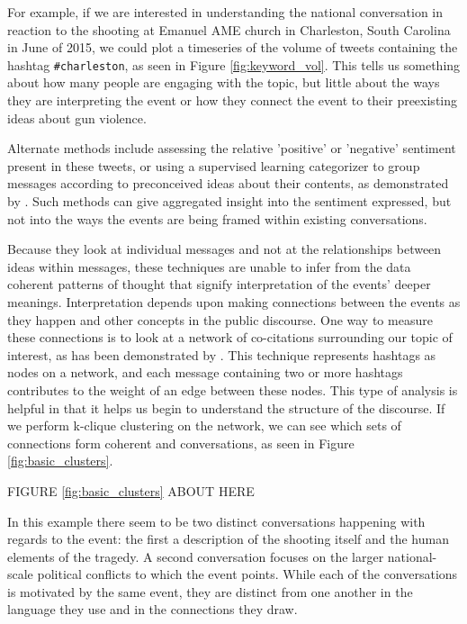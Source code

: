 \documentclass[12pt]{article}
\begin{document}
For example, if we are interested in understanding the national conversation in reaction to the shooting at Emanuel AME church in Charleston, South Carolina in June of 2015, we could plot a timeseries of the volume of tweets containing the hashtag \texttt{\#charleston}, as seen in Figure \ref{fig:keyword_vol}. This tells us something about how many people are engaging with the topic, but little about the ways they are interpreting the event or how they connect the event to their preexisting ideas about gun violence.

Alternate methods include assessing the relative 'positive' or 'negative' sentiment present in these tweets, or using a supervised learning categorizer to group messages according to preconceived ideas about their contents, as demonstrated by \cite{Becker2011,Ritter2010,Zubiaga2011}. Such methods can give aggregated insight into the sentiment expressed, but not into the ways the events are being framed within existing conversations.

Because they look at individual messages and not at the relationships between ideas within messages, these techniques are unable to infer from the data coherent patterns of thought that signify interpretation of the events' deeper meanings. 
Interpretation depends upon making connections between the events as they happen and other concepts in the public discourse. 
One way to measure these connections is to look at a network of co-citations surrounding our topic of interest, as has been demonstrated by \cite{Cogan2012,Smith2014}. 
This technique represents hashtags as nodes on a network, and each message containing two or more hashtags contributes to the weight of an edge between these nodes. 
This type of analysis is helpful in that it helps us begin to understand the structure of the discourse. 
If we perform k-clique clustering on the network, we can see which sets of connections form coherent and conversations, as seen in Figure \ref{fig:basic_clusters}.

\begin{center}
FIGURE \ref{fig:basic_clusters} ABOUT HERE
\end{center}

In this example there seem to be two distinct conversations happening with regards to the event: the first a description of the shooting itself and the human elements of the tragedy. 
A second conversation focuses on the larger national-scale political conflicts to which the event points. 
While each of the conversations is motivated by the same event, they are distinct from one another in the language they use and in the connections they draw.
\end{document}
